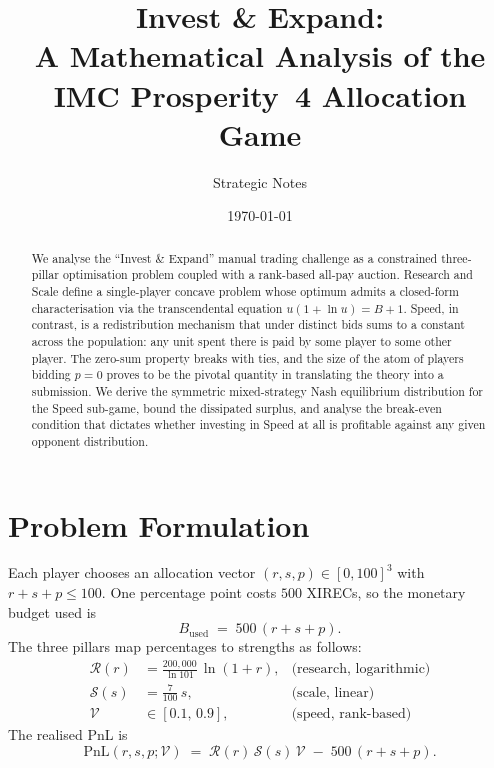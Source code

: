 \documentclass[11pt,a4paper]{article}
\title{\vspace{-1.5em}\textbf{Invest \& Expand:\\ A Mathematical Analysis of the IMC Prosperity~4 Allocation Game}}
\author{Strategic Notes}
\date{\today}
\theoremstyle{definition}
\theoremstyle{remark}
\newcommand{\PnL}{\mathrm{PnL}}
\newcommand{\R}{\mathcal{R}}
\newcommand{\Sc}{\mathcal{S}}
\newcommand{\Sp}{\mathcal{V}}
\begin{document}
\maketitle
\vspace{-1em}

\begin{abstract}
\noindent
We analyse the ``Invest \& Expand'' manual trading challenge as a constrained three-pillar
optimisation problem coupled with a rank-based all-pay auction. Research and Scale define
a single-player concave problem whose optimum admits a closed-form characterisation via
the transcendental equation \(u(1+\ln u)=B+1\). Speed, in contrast, is a redistribution
mechanism that under distinct bids sums to a constant across the population: any unit spent
there is paid by some player to some other player. The zero-sum property breaks with ties,
and the size of the atom of players bidding \(p=0\) proves to be the pivotal quantity in
translating the theory into a submission. We derive the symmetric mixed-strategy Nash
equilibrium distribution for the Speed sub-game, bound the dissipated surplus, and
analyse the break-even condition that dictates whether investing in Speed at all is
profitable against any given opponent distribution.
\end{abstract}

\section{Problem Formulation}

Each player chooses an allocation vector \((r,s,p)\in[0,100]^3\) with
\(r+s+p\le 100\). One percentage point costs \(500\) XIRECs, so the
monetary budget used is
\[
B_{\mathrm{used}} \;=\; 500\,(r+s+p).
\]
The three pillars map percentages to strengths as follows:
\begin{align}
\R(r) &= \frac{200{,}000}{\ln 101}\,\ln(1+r), & \text{(research, logarithmic)}\label{eq:research}\\
\Sc(s) &= \frac{7}{100}\,s, & \text{(scale, linear)}\label{eq:scale}\\
\Sp &\in[0.1,\,0.9], & \text{(speed, rank-based)}\label{eq:speed}
\end{align}
The realised PnL is
\begin{equation}\label{eq:pnl}
\PnL(r,s,p;\Sp) \;=\; \R(r)\,\Sc(s)\,\Sp \;-\; 500\,(r+s+p).
\end{equation}
\end{document}
